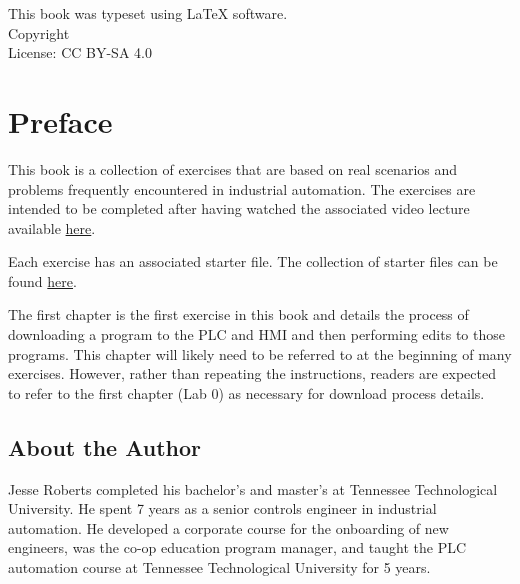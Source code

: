 \documentclass{book}
\makeatletter
\newcommand{\booklicense}{CC BY-SA 4.0}
\newcommand{\bookauthor}{\@author}
\makeatother
\begin{document}
\thispagestyle{empty}

\begin{flushleft}
\vspace*{\fill}
This book was typeset using \LaTeX{} software.\\
\vspace{\fill}
Copyright \textcopyright{} \the\year{}  \bookauthor\\
License: \booklicense
\end{flushleft}

\addtocounter{page}{2}

\chapter*{Preface}

This book is a collection of exercises that are based on real scenarios and problems frequently encountered in industrial automation. The exercises are intended to be completed after having watched the associated video lecture available \href{https://www.youtube.com/watch?v=DroUeHOe4lw&list=PL08zDkmLSnzFXJt9FVlfNPbG_KlcI_Qck&pp=gAQBiAQB}{here}. 

Each exercise has an associated starter file. The collection of starter files can be found \href{https://github.com/JesseTNRoberts/Introduction-to-PLC-Automation/}{here}.

The first chapter is the first exercise in this book and details the process of downloading a program to the PLC and HMI and then performing edits to those programs. This chapter will likely need to be referred to at the beginning of many exercises. However, rather than repeating the instructions, readers are expected to refer to the first chapter (Lab 0) as necessary for download process details.

\section*{About the Author}

Jesse Roberts completed his bachelor's and master's at Tennessee Technological University. He spent 7 years as a senior controls engineer in industrial automation. He developed a corporate course for the onboarding of new engineers, was the co-op education program manager, and taught the PLC automation course at Tennessee Technological University for 5 years.
\end{document}
